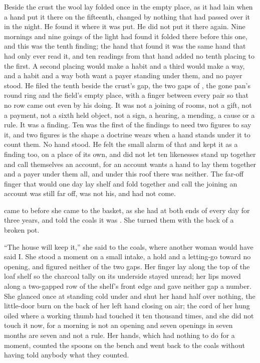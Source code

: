 Beside the crust the wool lay folded once in the empty place, as it had lain when a hand put it there on the fifteenth, changed by nothing that had passed over it in the night. He found it where it was put. He did not put it there again. Nine mornings and nine goings of the light had found it folded there before this one, and this was the tenth finding; the hand that found it was the same hand that had only ever read it, and ten readings from that hand added no tenth placing to the first. A second placing would make a habit and a third would make a way, and a habit and a way both want a payer standing under them, and no payer stood. He filed the tenth beside the crust's gap, the two gaps of , the gone pan's round ring and the field's empty place, with a finger between every pair so that no row came out even by his doing. It was not a joining of rooms, not a gift, not a payment, not a sixth held object, not a sign, a hearing, a mending, a cause or a rule. It was a finding. Ten was the first of the findings to need two figures to say it, and two figures is the shape a doctrine wears when a hand stands under it to count them. No hand stood. He felt the small alarm of that and kept it as a finding too, on a place of its own, and did not let ten likenesses stand up together and call themselves an account, for an account wants a hand to lay them together and a payer under them all, and under this roof there was neither. The far-off finger that would one day lay shelf and fold together and call the joining an account was still far off, was not his, and had not come.

\scenebreak

 came to  before she came to the basket, as she had at both ends of every day for three years, and told the coals it was . She turned them with the back of a broken pot.

“The house will keep it,” she said to the coals, where another woman would have said I. She stood a moment on a small intake, a hold and a letting-go toward no opening, and figured neither of the two gaps. Her finger lay along the top of the loaf shelf so the charcoal tally on its underside stayed unread; her lips moved along a two-gapped row of the shelf's front edge and gave neither gap a number. She glanced once at  standing cold under  and shut her hand half over nothing, the little-door burn on the back of her left hand closing on air; the cord of her  hung oiled where a working thumb had touched it ten thousand times, and she did not touch it now, for a morning is not an opening and seven openings in seven months are seven and not a rule. Her hands, which had nothing to do for a moment, counted the spoons on the bench and went back to the coals without having told anybody what they counted.

